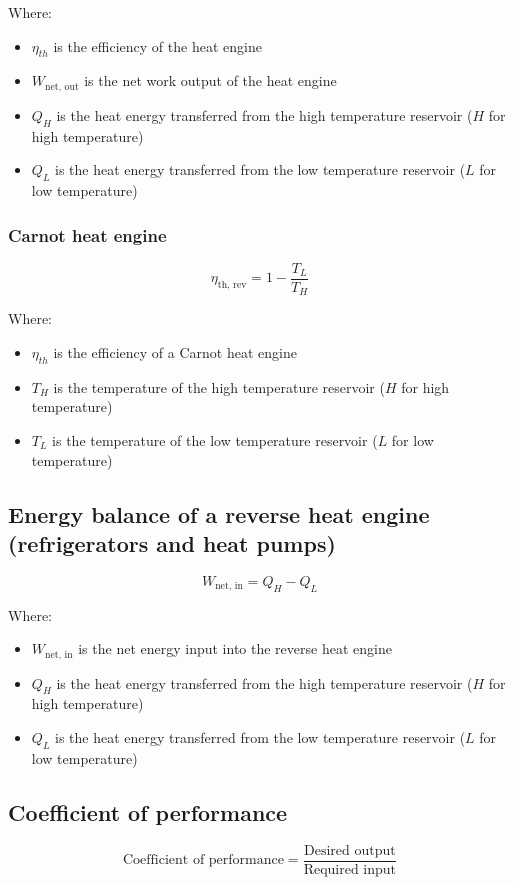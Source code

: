 \documentclass[11pt]{article}
\begin{document}
Where:
\begin{itemize}
\item \(\eta_{th}\) is the efficiency of the heat engine
\item \(W_{\text{net, out}}\) is the net work output of the heat engine
\item \(Q_{H}\) is the heat energy transferred from the high temperature reservoir (\(H\) for high temperature)
\item \(Q_{L}\) is the heat energy transferred from the low temperature reservoir (\(L\) for low temperature)
\end{itemize}
\subsubsection{Carnot heat engine}
\label{sec:org5476e65}
\[\eta_{\text{th, rev}} = 1 - \frac{T_L}{T_H}\]

Where:
\begin{itemize}
\item \(\eta_{th}\) is the efficiency of a Carnot heat engine
\item \(T_{H}\) is the temperature of the high temperature reservoir (\(H\) for high temperature)
\item \(T_{L}\) is the temperature of the low temperature reservoir (\(L\) for low temperature)
\end{itemize}
\subsection{Energy balance of a reverse heat engine (refrigerators and heat pumps)}
\label{sec:org67e86f4}
\[W_{\text{net, in}} = Q_{H} - Q_{L}\]

Where:
\begin{itemize}
\item \(W_{\text{net, in}}\) is the net energy input into the reverse heat engine
\item \(Q_{H}\) is the heat energy transferred from the high temperature reservoir (\(H\) for high temperature)
\item \(Q_{L}\) is the heat energy transferred from the low temperature reservoir (\(L\) for low temperature)
\end{itemize}
\subsection{Coefficient of performance}
\label{sec:org955513b}
\[\text{Coefficient of performance} = \frac{\text{Desired output}}{\text{Required input}}\]
\end{document}
